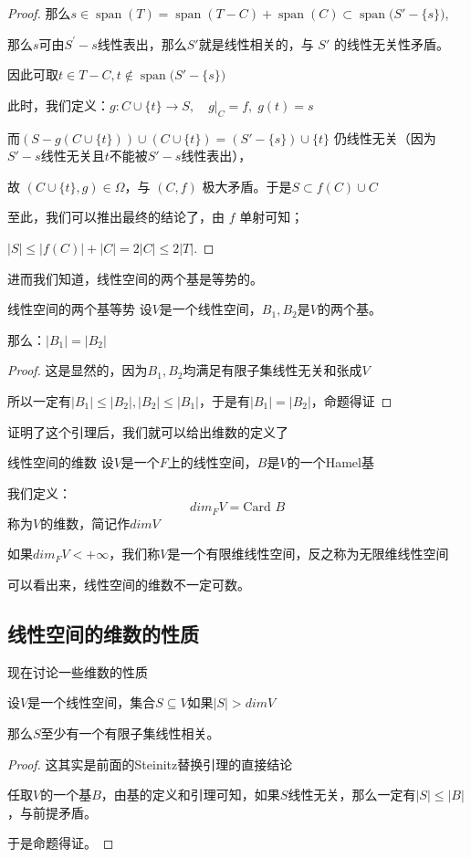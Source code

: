 \documentclass[12pt, a4paper, oneside, UTF8]{ctexbook}
\begin{document}
\begin{proof}
				那么$s\in\operatorname{span}(T)=\operatorname{span}(T- C)+\operatorname{span}(C)\subset \operatorname{span}\bigl(S'-\{s\}\bigr)$,
				
				那么$s$可由$S^\prime{}-{s}$线性表出，那么$S'$就是线性相关的，与 $S'$ 的线性无关性矛盾。
				
				因此可取$t\in T- C,t\notin\operatorname{span}\bigl(S'-\{s\}\bigr)$
				
				此时，我们定义：$g:C\cup\{t\}\longrightarrow S,\quad g|_C=f,\;g(t)=s$

				而$(S- g(C\cup\{t\}))\cup (C\cup\{t\})=(S'-\{s\})\cup\{t\}$ 仍线性无关（因为$S'-{s}$线性无关且$t$不能被$S'-{s}$线性表出），
				
				故 $(C\cup\{t\},g)\in\Omega$，与 $(C,f)$ 极大矛盾。于是$S\subset f(C)\cup C$

				至此，我们可以推出最终的结论了，由 $f$ 单射可知；
				
				$|S|\leqslant |f(C)|+|C|= 2|C|\leqslant 2|T|.$
			\end{proof}
			进而我们知道，线性空间的两个基是等势的。
			\begin{lemma}{线性空间的两个基等势}{}
				设$V$是一个线性空间，$B_1,B_2$是$V$的两个基。

				那么：$|B_1|=|B_2|$
			\end{lemma}
			\begin{proof}
				这是显然的，因为$B_1,B_2$均满足有限子集线性无关和张成$V$

				所以一定有$|B_1| \leqslant |B_2|,|B_2| \leqslant |B_1|$，于是有$|B_1|=|B_2|$，命题得证
			\end{proof}
			证明了这个引理后，我们就可以给出维数的定义了
			\begin{defn}{线性空间的维数}{}
				设$V$是一个$F$上的线性空间，$B$是$V$的一个Hamel基

				我们定义：
				\begin{equation}
					dim_F V = \text{Card }B
				\end{equation}
				称为$V$的维数，简记作$dim V$

				如果$dim_F V < +\infty$，我们称$V$是一个有限维线性空间，反之称为无限维线性空间
			\end{defn}
			可以看出来，线性空间的维数不一定可数。
		\subsection{线性空间的维数的性质}
			现在讨论一些维数的性质
			\begin{para}{0}
				\point{}
					\begin{proposition}
						设$V$是一个线性空间，集合$S \subseteq V$如果$|S| > dim V$

						那么$S$至少有一个有限子集线性相关。
					\end{proposition}
					\begin{proof}
						这其实是前面的Steinitz替换引理的直接结论

						任取$V$的一个基$B$，由基的定义和引理可知，如果$S$线性无关，那么一定有$|S| \leqslant |B|$，与前提矛盾。

						于是命题得证。
					\end{proof}
				\point{}
			\end{para}
\end{document}
